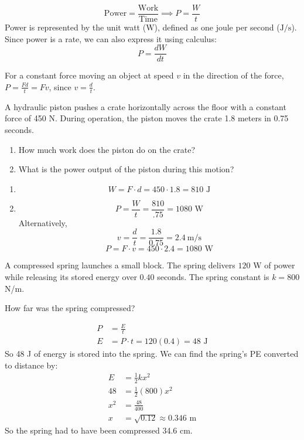 \begin{mdframed}[style=important, frametitle={Formula for Power}]
	\[\text{Power} = \frac{\text{Work}}{\text{Time}} \implies P = \frac{W}{t}\]
  Power is represented by the unit watt ($\text{W}$), defined as one joule per second ($\text{J/s}$).
	Since power is a rate, we can also express it using calculus:
	\[P=\frac{dW}{dt}\]

	For a constant force moving an object at speed $v$ in the direction of the force, $P=\frac{F d}{t} = F v$, since $v = \frac{d}{t}$.
\end{mdframed}

\begin{Exercise}[title=Hydraulic Piston Problem,label=power1]
A hydraulic piston pushes a crate horizontally across the floor with a constant force of 450 N.
During operation, the piston moves the crate 1.8 meters in 0.75 seconds.

\begin{enumerate}[label=(\alph*)]
  \item How much work does the piston do on the crate?
  \item What is the power output of the piston during this motion?
\end{enumerate}
\end{Exercise}
\begin{Answer}[ref=power1]
\begin{enumerate}[label=(\alph*)]
  \item $$W = F\cdot d = 450 \cdot  1.8 =810 \text{ J}$$
  \item $$P = \frac{W}{t} = \frac{810}{.75} = 1080 \text{ W}$$
  Alternatively,
  $$v = \frac{d}{t} = \frac{1.8}{0.75} = 2.4\ \text{m/s}$$
  $$P = F\cdot v = 450 \cdot 2.4 = 1080 \text{ W}$$
\end{enumerate}
\end{Answer}

\begin{Exercise}[title=Spring Power, label=power2]
A compressed spring launches a small block. The spring delivers $120$ W of power while releasing its stored energy over $0.40$ seconds. The spring constant is $k = 800$ N/m.

How far was the spring compressed?
\end{Exercise}

\begin{Answer}[ref=power2]
\begin{align*}
  P &= \frac{E}{t} \\
  E &= P\cdot t = 120 (0.4) = 48 \text{ J}
\end{align*}
So 48 J of energy is stored into the spring. We can find the spring's PE converted to distance by:
\begin{align*}
  E &= \frac{1}{2}kx^2\\
  48 &= \frac{1}{2}(800)x^2 \\
  x^2 &= \frac{48}{400} \\ 
  x &= \sqrt{0.12} \approx 0.346 \text{ m}
\end{align*}
So the spring had to have been compressed 34.6 cm.
\end{Answer}

